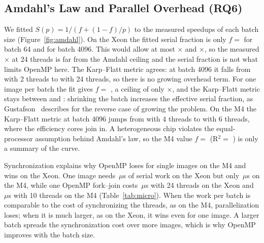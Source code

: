 \subsection{Amdahl's Law and Parallel Overhead (RQ6)}
We fitted $S(p)=1/(f+(1-f)/p)$ to the measured speedups of each batch size (Figure~\ref{fig:amdahl}). On the Xeon the fitted serial fraction is only $f=$  for batch 64 and  for batch 4096. This would allow at most $\times$ and $\times$, so the measured $\times$ at 24 threads is far from the Amdahl ceiling and the serial fraction is not what limits OpenMP here. The Karp--Flatt metric agrees: at batch 4096 it falls from  with 2 threads to  with 24 threads, so there is no growing overhead term. For one image per batch the fit gives $f=$ , a ceiling of only $\times$, and the Karp--Flatt metric stays between  and : shrinking the batch increases the effective serial fraction, as Gustafson~\cite{gustafson1988reevaluating} describes for the reverse case of growing the problem. On the M4 the Karp--Flatt metric at batch 4096 jumps from  with 4 threads to  with 6 threads, where the efficiency cores join in. A heterogeneous chip violates the equal-processor assumption behind Amdahl's law, so the M4 value $f=$  (R$^2=$ ) is only a summary of the curve.


Synchronization explains why OpenMP loses for single images on the M4 and wins on the Xeon. One image needs \,$\mu$s of serial work on the Xeon but only \,$\mu$s on the M4, while one OpenMP fork--join costs \,$\mu$s with 24 threads on the Xeon and \,$\mu$s with 10 threads on the M4 (Table~\ref{tab:micro}). When the work per batch is comparable to the cost of synchronizing the threads, as on the M4, parallelization loses; when it is much larger, as on the Xeon, it wins even for one image. A larger batch spreads the synchronization cost over more images, which is why OpenMP improves with the batch size.

